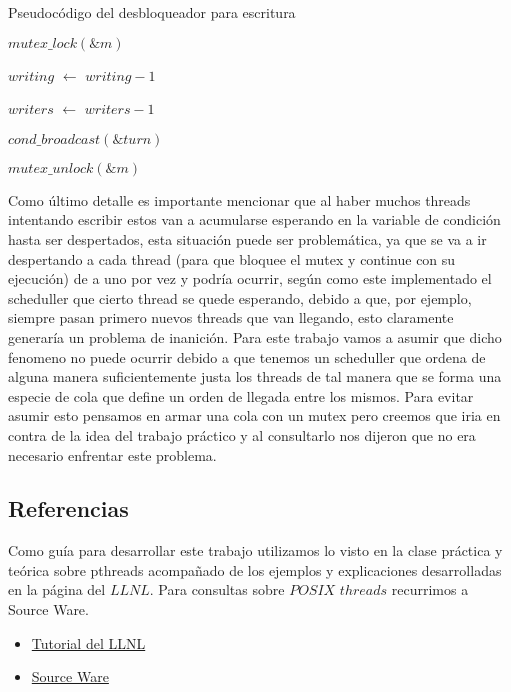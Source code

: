 \begin{algorithm}[H]
  \begin{algorithmic}[1]
  \caption{Pseudocódigo del desbloqueador para escritura}
  \label{algo:3-1}
	\State $mutex\_lock(\&m)$

	\State $writing$ $\leftarrow$ $writing - 1$
	
	\State $writers$ $\leftarrow$ $writers - 1$
	
	\State $cond\_broadcast(\&turn)$

	\State $mutex\_unlock(\&m)$

	\EndProcedure
	\end{algorithmic}
\end{algorithm}

Como último detalle es importante mencionar que al haber muchos threads intentando escribir estos van a acumularse esperando en la variable de condición hasta ser despertados, esta situación puede ser problemática, ya que se va a ir despertando a cada thread (para que bloquee el mutex y continue con su ejecución) de a uno por vez y podría ocurrir, según como este implementado el scheduller que cierto thread se quede esperando, debido a que, por ejemplo, siempre pasan primero nuevos threads que van llegando, esto claramente generaría un problema de inanición. Para este trabajo vamos a asumir que dicho fenomeno no puede ocurrir debido a que tenemos un scheduller que ordena de alguna manera suficientemente justa los threads de tal manera que se forma una especie de cola que define un orden de llegada entre los mismos. Para evitar asumir esto pensamos en armar una cola con un mutex pero creemos que iria en contra de la idea del trabajo práctico y al consultarlo nos dijeron que no era necesario enfrentar este problema.

\subsection{Referencias}

Como guía para desarrollar este trabajo utilizamos lo visto en la clase práctica y teórica sobre pthreads acompañado de los ejemplos y explicaciones desarrolladas en la página del $LLNL$. Para consultas sobre $POSIX$ $threads$ recurrimos a Source Ware.

\begin{itemize}

\item \href{https://computing.llnl.gov/tutorials/pthreads/}{Tutorial del LLNL}

\item \href{https://www.sourceware.org/pthreads-win32/manual/}{Source Ware}

\end{itemize}

